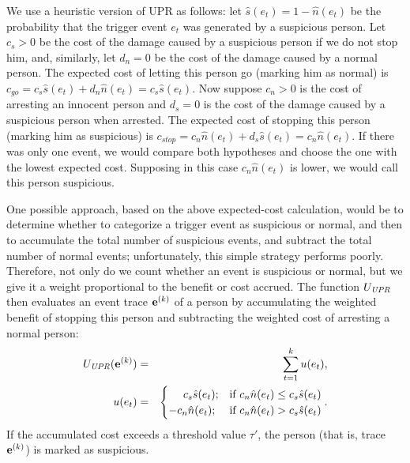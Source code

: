 We use a heuristic version of UPR as follows: let $\hat{s}(e_t)=1-\hat{n}(e_t)$ be the probability that the trigger event $e_t$ was generated by a suspicious person. Let $c_s>0$ be the cost of the damage caused by a suspicious person if we do not stop him, and, similarly, let $d_n=0$ be the cost of the damage caused by a normal person. The expected cost of letting this person go (marking him as normal) is $c_{go} = c_s \hat{s}(e_t)  + d_n \hat{n}(e_t) = c_s \hat{s}(e_t)$. Now suppose $c_n>0$ is the cost of arresting an innocent person and $d_s=0$ is the cost of the damage caused by a suspicious person when arrested. The expected cost of stopping this person (marking him as suspicious) is $c_{stop} =  c_n \hat{n}(e_t) + d_s \hat{s}(e_t) = c_n \hat{n}(e_t) $. 
If there was only one event, we would compare both hypotheses and choose the one with the lowest expected cost. Supposing in this case $c_n \hat{n}(e_t)$ is lower, we would call this person suspicious.

One possible approach, based on the above expected-cost calculation, would be to determine whether to categorize a trigger event as suspicious or normal, and then to accumulate the total number of suspicious events, and subtract the total number of normal events; unfortunately, this simple strategy performs poorly. %
Therefore, not only do we count whether an event is suspicious or normal, but we give it a weight proportional to the benefit or cost accrued. 
%
The function $U_{\mathit{UPR}}$ then evaluates an event trace $\mathbf{e}^{\scriptsize(k)}$ of a person by accumulating the weighted benefit of stopping this person and subtracting the weighted cost of arresting a normal person:
\begin{eqnarray}
	U_{\mathit{UPR}}(\mathbf{e}^{\scriptsize(k)}) &=&  \sum_{t = 1}^{k} u(e_t),\\
	u(e_t) &=& 
		\begin{cases}
		~~~~c_s \hat{s}(e_t); & \text{if } c_n \hat{n}(e_t) \leq c_s \hat{s}(e_t) \\
	   		-c_n \hat{n}(e_t); & \text{if } c_n \hat{n}(e_t) > c_s \hat{s}(e_t) \\
	  	\end{cases}.
\end{eqnarray}
If the accumulated cost exceeds a threshold value $\tau'$, the person (that is, trace $\mathbf{e}^{\scriptsize(k)}$) is marked as suspicious.

